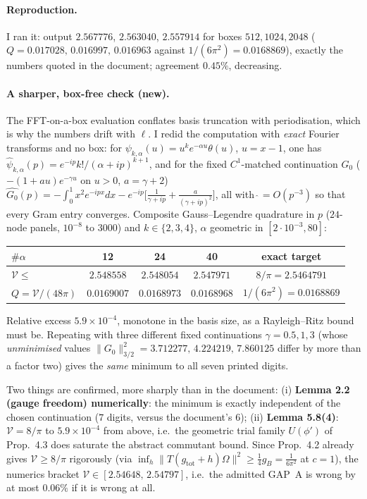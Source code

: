 \documentclass[11pt]{article}
\newcommand{\norm}[1]{\lVert#1\rVert}
\newcommand{\gB}{g_B}
\newcommand{\Om}{\Omega}
\newcommand{\gtot}{g_{\mathrm{tot}}}
\begin{document}
\paragraph{Reproduction.}  I ran it: output
$2.567776$, $2.563040$, $2.557914$ for boxes $512,1024,2048$ ($Q=0.017028,\,0.016997,\,0.016963$ against
$1/(6\pi^2)=0.0168869$), exactly the numbers quoted in the document; agreement $0.45\%$, decreasing.

\paragraph{A sharper, box-free check (new).}  The FFT-on-a-box evaluation conflates basis truncation with
periodisation, which is why the numbers drift with $\ell$.  I redid the computation with \emph{exact}
Fourier transforms and no box: for $\psi_{k,\alpha}(u)=u^ke^{-\alpha u}\theta(u)$, $u=x-1$, one has
$\widehat\psi_{k,\alpha}(p)=e^{-ip}k!/(\alpha+ip)^{k+1}$, and for the fixed $C^1$-matched continuation
$G_0$ ($-(1+au)e^{-\gamma u}$ on $u>0$, $a=\gamma+2$)
$\widehat{G_0}(p)=-\int_0^1x^2e^{-ipx}dx-e^{-ip}\bigl[\frac1{\gamma+ip}+\frac a{(\gamma+ip)^2}\bigr]$,
all with $\widehat{\ }=O(p^{-3})$ so that every Gram entry converges.  Composite Gauss--Legendre
quadrature in $p$ ($24$-node panels, $10^{-8}$ to $3000$) and $k\in\{2,3,4\}$, $\alpha$ geometric in
$[2\cdot10^{-3},80]$:
\begin{center}\small
\begin{tabular}{@{}lcccc@{}}\toprule
$\#\alpha$ & 12 & 24 & 40 & exact target\\\midrule
$\mathcal V\le$ & $2.548558$ & $2.548054$ & $2.547971$ & $8/\pi=2.5464791$\\
$Q=\mathcal V/(48\pi)$ & $0.0169007$ & $0.0168973$ & $0.0168968$ & $1/(6\pi^2)=0.0168869$\\\bottomrule
\end{tabular}
\end{center}
Relative excess $5.9\times10^{-4}$, monotone in the basis size, as a Rayleigh--Ritz bound must be.  Repeating
with three different fixed continuations $\gamma=0.5,1,3$ (whose \emph{unminimised} values
$\norm{G_0}_{3/2}^2=3.712277,\,4.224219,\,7.860125$ differ by more than a factor two) gives the
\emph{same} minimum to all seven printed digits.
\begin{verdictok}
Two things are confirmed, more sharply than in the document:
(i) \textbf{Lemma 2.2 (gauge freedom) numerically}: the minimum is exactly independent of the chosen
continuation ($7$ digits, versus the document's $6$);
(ii) \textbf{Lemma 5.8(4)}: $\mathcal V=8/\pi$ to $5.9\times10^{-4}$ from above, i.e.\ the geometric trial
family $U(\phi')$ of Prop.~4.3 does saturate the abstract commutant bound.  Since Prop.~4.2 already gives
$\mathcal V\ge8/\pi$ rigorously (via $\inf_h\norm{T(\gtot+h)\Om}^2\ge\frac14\gB=\frac1{6\pi^2}$ at $c=1$),
the numerics bracket $\mathcal V\in[2.54648,\,2.54797]$, i.e.\ the admitted GAP~A is wrong by at most
$0.06\%$ if it is wrong at all.
\end{verdictok}
\end{document}

